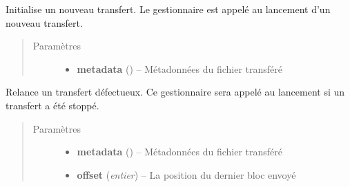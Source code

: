 \documentclass[letterpaper,10pt,english]{sphinxmanual}
\begin{document}

\begin{fulllineitems}
\label{drivers:start_upload}
Initialise un nouveau transfert. Le gestionnaire est appelé au lancement d'un nouveau transfert.
\begin{quote}\begin{description}
\item[{Paramètres}] \leavevmode\begin{itemize}
\item {} 
\textbf{metadata} ({\hyperref[drivers:onitu.api.metadata.Metadata]{}}) -- Métadonnées du fichier transféré

\end{itemize}

\end{description}\end{quote}

\end{fulllineitems}


\begin{fulllineitems}
\label{drivers:restart_upload}
Relance un transfert défectueux. Ce gestionnaire sera appelé au lancement si un transfert a été stoppé.
\begin{quote}\begin{description}
\item[{Paramètres}] \leavevmode\begin{itemize}
\item {} 
\textbf{metadata} ({\hyperref[drivers:onitu.api.metadata.Metadata]{}}) -- Métadonnées du fichier transféré

\item {} 
\textbf{offset} (\emph{entier}) -- La position du dernier bloc envoyé

\end{itemize}

\end{description}\end{quote}

\end{fulllineitems}

\end{document}
